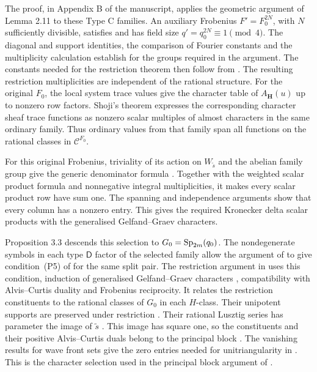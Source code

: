 The proof, in Appendix B of the manuscript, applies the geometric argument of Lemma 2.11
to these Type C families. An auxiliary Frobenius $F'=F_0^{2N}$,
with $N$ sufficiently divisible, satisfies
\cite[(4.7)(a)--(c)]{Geck1999GGGR} and has field size
$q'=q_0^{2N}\equiv1\pmod4$. The diagonal and support identities,
the comparison of Fourier constants and the multiplicity calculation
establish \cite[Proposition~3.1 and Corollary~3.2]{Geck1999GGGR}
for the groups required in the argument. The constants needed for
the restriction theorem then follow from
\cite[Theorem~3.8]{Geck1999GGGR}.
The resulting restriction multiplicities are independent of the
rational structure. For the original $F_0$, the local system trace
values give the character table of $A_{\mathbf H}(u)$ up to nonzero
row factors. Shoji's theorem \cite[Theorem~3.2]{Shoji1995II} expresses
the corresponding character sheaf trace functions as nonzero scalar
multiples of almost characters in the same ordinary family. Thus
ordinary values from that family span all functions on the rational
classes in $\mathcal C^{F_0}$.

For this original Frobenius, triviality of its action on
$W_{\widetilde s}$ and the abelian family group give the generic
denominator formula \cite[(6.1)(c)]{Geck1999GGGR}.
Together with the weighted scalar product formula and nonnegative
integral multiplicities, it makes every scalar product row have
sum one. The spanning and independence arguments show that every
column has a nonzero entry. This gives the required Kronecker delta
scalar products with the generalised Gelfand--Graev characters.

Proposition 3.3 descends this selection to $G_0=\operatorname{Sp}_{2m}(q_0)$.
The nondegenerate symbols in each type $\mathsf D$ factor of the
selected family allow the argument of \cite[10.3]{Taylor2014Maximal}
to give condition~\textup{(P5)} of \cite[Theorem~3.2]{Taylor2013}
for the same split pair. The restriction argument in
\cite[Proposition~5.4]{Taylor2013} uses this condition, induction of
generalised Gelfand--Graev characters
\cite[proof of Lemma~14.12]{Taylor2016}, compatibility with
Alvis--Curtis duality and Frobenius reciprocity. It relates the
restriction constituents to the rational classes of $G_0$ in each
$H$-class. Their unipotent supports are preserved under restriction
\cite[Example~2.7.18]{GeckMalle2020}. Their rational Lusztig series
has parameter the image of $\widetilde s$
\cite[Proposition~2.6.16]{GeckMalle2020}. This image has square one,
so the constituents and their positive Alvis--Curtis duals belong
to the principal block
\cite[Proposition~9.8(iv) and Theorem~21.14]{CabanesEnguehard2004}.
The vanishing results for wave front sets give the zero entries needed for unitriangularity in \cite[Theorem~2.9]{Chaneb2021}. This is the
character selection used in the principal block argument of
\cite[Section~4.1 and Corollary~4.3]{FengMalle2022}.

